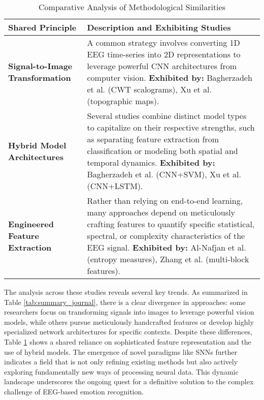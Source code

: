 \documentclass[conference]{IEEEtran}
\begin{document}
\begin{table}[htbp]
\centering
\caption{Comparative Analysis of Methodological Similarities}
\label{tab:method_similarities}
\renewcommand{\arraystretch}{1.5}
\begin{tabular}{p{3cm} p{5cm}}
\hline
\textbf{Shared Principle} & \textbf{Description and Exhibiting Studies} \\
\hline
\textbf{Signal-to-Image Transformation}
& A common strategy involves converting 1D EEG time-series into 2D representations to leverage powerful CNN architectures from computer vision.
\textbf{Exhibited by:} Bagherzadeh et al. \cite{b1} (CWT scalograms), Xu et al. \cite{b2} (topographic maps). \\
\hline
\textbf{Hybrid Model Architectures}
& Several studies combine distinct model types to capitalize on their respective strengths, such as separating feature extraction from classification or modeling both spatial and temporal dynamics.
\textbf{Exhibited by:} Bagherzadeh et al. \cite{b1} (CNN+SVM), Xu et al. \cite{b2} (CNN+LSTM). \\
\hline
\textbf{Engineered Feature Extraction}
& Rather than relying on end-to-end learning, many approaches depend on meticulously crafting features to quantify specific statistical, spectral, or complexity characteristics of the EEG signal.
\textbf{Exhibited by:} Al-Nafjan et al. \cite{b3} (entropy measures), Zhang et al. \cite{b4} (multi-block features). \\
\hline
\end{tabular}
\end{table}

The analysis across these studies reveals several key trends. As summarized in Table \ref{tab:summary_journal}, there is a clear divergence in approaches: some researchers focus on transforming signals into images to leverage powerful vision models, while others pursue meticulously handcrafted features or develop highly specialized network architectures for specific contexts. Despite these differences, Table \ref{tab:method_similarities} shows a shared reliance on sophisticated feature representation and the use of hybrid models. The emergence of novel paradigms like SNNs \cite{b5} further indicates a field that is not only refining existing methods but also actively exploring fundamentally new ways of processing neural data. This dynamic landscape underscores the ongoing quest for a definitive solution to the complex challenge of EEG-based emotion recognition.
\end{document}
